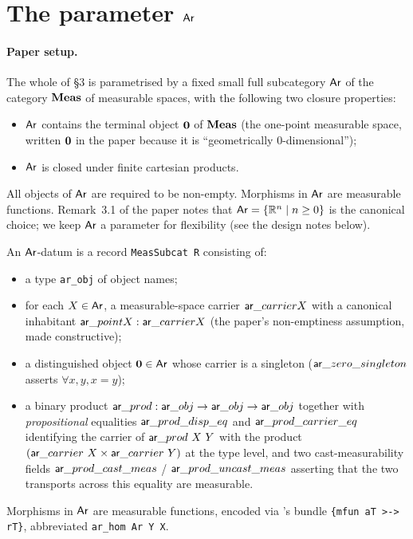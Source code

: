 \section{The parameter \texorpdfstring{$\mathsf{Ar}$}{Ar}}\label{sec:ar}

\paragraph{Paper setup.}
The whole of \S3 is parametrised by a fixed small full subcategory
$\mathsf{Ar}$ of the category $\mathbf{Meas}$ of measurable spaces, with the following
two closure properties:
\begin{itemize}
  \item $\mathsf{Ar}$ contains the terminal object $\mathbf{0}$ of $\mathbf{Meas}$
    (the one-point measurable space, written $\mathbf{0}$ in the paper
    because it is ``geometrically $0$-dimensional'');
  \item $\mathsf{Ar}$ is closed under finite cartesian products.
\end{itemize}
All objects of $\mathsf{Ar}$ are required to be non-empty. Morphisms in $\mathsf{Ar}$
are measurable functions. Remark~3.1 of the paper notes that
$\mathsf{Ar} = \{ \mathbb{R}^n \mid n \ge 0 \}$ is the canonical choice; we
keep $\mathsf{Ar}$ a parameter for flexibility (see the design notes below).

\begin{definition}\label{def:meas-subcat}
  \uses{}
  \rocqok
  An $\mathsf{Ar}$-datum is a record \texttt{MeasSubcat R} consisting of:
  \begin{itemize}
    \item a type \texttt{ar\_obj} of object names;
    \item for each $X \in \mathsf{Ar}$, a measurable-space carrier
      $\mathsf{ar}\_carrier X$ with a canonical inhabitant
      $\mathsf{ar}\_point X : \mathsf{ar}\_carrier X$ (the paper's non-emptiness
      assumption, made constructive);
    \item a distinguished object $\mathbf{0} \in \mathsf{Ar}$ whose carrier is a
      singleton ($\mathsf{ar}\_zero\_singleton$ asserts $\forall x, y, x = y$);
    \item a binary product
      $\mathsf{ar}\_prod : \mathsf{ar}\_obj \to \mathsf{ar}\_obj \to \mathsf{ar}\_obj$ together with
      \emph{propositional} equalities
      $\mathsf{ar}\_prod\_disp\_eq$ and $\mathsf{ar}\_prod\_carrier\_eq$ identifying the
      carrier of $\mathsf{ar}\_prod\ X\ Y$ with the product
      $(\mathsf{ar}\_carrier\ X \times \mathsf{ar}\_carrier\ Y)$ at the type level, and
      two cast-measurability fields
      $\mathsf{ar}\_prod\_cast\_meas$ /
      $\mathsf{ar}\_prod\_uncast\_meas$ asserting that the two transports
      across this equality are measurable.
  \end{itemize}
  Morphisms in $\mathsf{Ar}$ are measurable functions, encoded via
  \mathcompA's bundle \texttt{\{mfun aT >-> rT\}}, abbreviated
  \texttt{ar\_hom Ar Y X}.
\end{definition}

